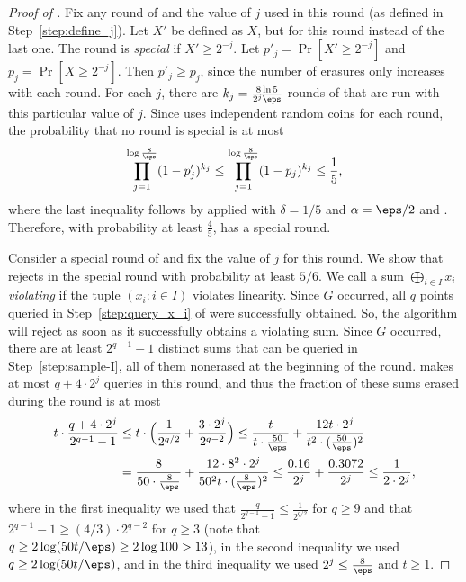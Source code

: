 \documentclass[11pt]{article}
\numberwithin{equation}{section}
\theoremstyle{definition}
\theoremstyle{plain}
\begin{document}
\begin{proof}[Proof of ]
Fix any round of  and the value of $j$ used in this round (as defined in Step~\ref{step:define_j}). Let $X'$ be defined as $X$, but for this round instead of the last one.
The round is \emph{special} if $X' \geq 2^{-j}$. Let $p'_j = \Pr[X' \geq 2^{-j}]$ and $p_j = \Pr[X\geq 2^{-j}]$. 
Then  $p'_j\geq p_j$, since the number of erasures only increases with each round. For each $j$, there are $k_j = \frac{8 \ln 5}{2^j \eps}$ rounds of  that are run with this particular value of $j$. Since  uses independent random coins for each round, the probability that no round is special is at most
\begin{equation*}
    \prod_{j=1}^{\log \frac{8}{\eps}}(1-p'_j)^{k_j} \leq \prod_{j=1}^{\log \frac{8}{\eps}}(1-p_j)^{k_j} \leq \frac{1}{5},
\end{equation*}
where the last inequality follows by  applied with $\delta=1/5$ and $\alpha=\eps/2$ and . Therefore, with probability at least $\frac{4}{5}$,  has a special round. 



Consider a special round of  and fix the value of $j$ for this round. We show that  rejects in the special round 
with probability at least $5/6$. We call a sum $\bigoplus_{i\in I}x_i$ {\em violating} if the tuple $(x_i \colon i \in I)$ violates linearity. Since $G$ occurred, all $q$ points queried in Step~\ref{step:query_x_i} of  were successfully obtained. So, the algorithm will reject as soon as it successfully obtains a violating sum. Since $G$ occurred, there are at least $2^{q-1}-1$ distinct sums that can be queried in Step~\ref{step:sample-I}, all of them nonerased at the beginning of the round.  makes at most $q + 4\cdot 2^j$ queries in this round, and thus the fraction of these sums erased during the round is at most
\begin{align*}
    t\cdot\frac{q + 4\cdot 2^j}{2^{q-1}-1}
   &\leq  t\cdot \Big(\frac{1}{2^{q/2}} + \frac{3\cdot 2^j}{2^{q-2}} \Big)
   \leq 
  \frac{t}{t \cdot \frac{50}{\eps}} + \frac{12t \cdot 2^j}{t^2 \cdot (\frac{50}{\eps})^2} \\
   &=   \frac{8}{50 \cdot \frac{8}{\eps}} + \frac{12 \cdot 8^2\cdot 2^j}{50^2t \cdot (\frac{8}{\eps})^2} 
   \leq 
 \frac{0.16}{2^j} + \frac{0.3072}{ 2^j} 
      \leq 
     \frac{1}{2 \cdot 2^j},
\end{align*}
where in the first inequality we used that $\frac{q}{2^{q-1}-1} \leq \frac{1}{2^{q/2}}$  for $q \geq 9$ and that $2^{q-1}-1\geq (4/3)\cdot 2^{q-2}$ for $q\geq 3$ (note that $q \geq 2\log(50t/\eps)\geq 2\log 100>13$), in the second inequality we used $q \geq 2\log(50t/\eps)$, and in the third inequality we used $2^j \leq \frac{8}{\eps}$ and $t\geq 1$. 


\end{proof}
\end{document}
